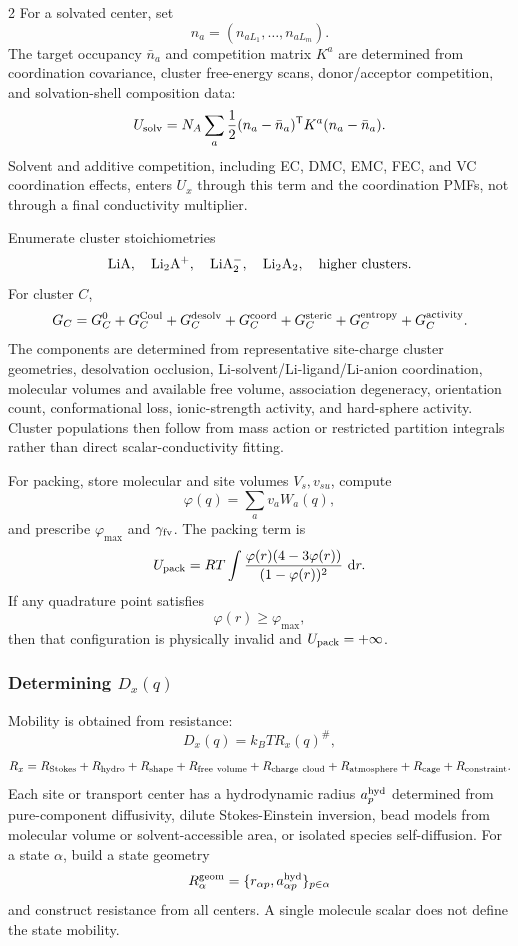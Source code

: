 \documentclass[10pt]{article}
\newcommand{\dd}{\,\mathrm d}
\newcommand{\T}{\mathsf{T}}
\begin{document}
\begin{multicols}{2}
For a solvated center, set
\[
n_a=(n_{aL_1},\ldots,n_{aL_m}).
\]
The target occupancy \(\bar n_a\) and competition matrix \(K^a\) are determined
from coordination covariance, cluster free-energy scans, donor/acceptor
competition, and solvation-shell composition data:
\[
U_{\rm solv}
=
N_A\sum_a\frac12(n_a-\bar n_a)^\T K^a(n_a-\bar n_a).
\]
Solvent and additive competition, including EC, DMC, EMC, FEC, and VC
coordination effects, enters \(U_x\) through this term and the coordination
PMFs, not through a final conductivity multiplier.

Enumerate cluster stoichiometries
\[
{\rm LiA},\quad {\rm Li_2A^+},\quad {\rm LiA_2^-},\quad
{\rm Li_2A_2},\quad {\rm higher\ clusters}.
\]
For cluster \(C\),
\[
G_C=
G_C^0
+G_C^{\rm Coul}
+G_C^{\rm desolv}
+G_C^{\rm coord}
+G_C^{\rm steric}
+G_C^{\rm entropy}
+G_C^{\rm activity}.
\]
The components are determined from representative site-charge cluster
geometries, desolvation occlusion, Li-solvent/Li-ligand/Li-anion coordination,
molecular volumes and available free volume, association degeneracy,
orientation count, conformational loss, ionic-strength activity, and
hard-sphere activity. Cluster populations then follow from mass action or
restricted partition integrals rather than direct scalar-conductivity fitting.

For packing, store molecular and site volumes \(V_s,v_{su}\), compute
\[
\varphi(q)=\sum_av_aW_a(q),
\]
and prescribe \(\varphi_{\max}\) and \(\gamma_{\rm fv}\). The packing term is
\[
U_{\rm pack}
=
RT\int
\frac{\varphi(r)(4-3\varphi(r))}
{(1-\varphi(r))^2}\,\dd r.
\]
If any quadrature point satisfies
\[
\varphi(r)\ge\varphi_{\max},
\]
then that configuration is physically invalid and \(U_{\rm pack}=+\infty\).

\subsubsection{Determining \(D_x(q)\)}

Mobility is obtained from resistance:
\[
D_x(q)=k_BT R_x(q)^\#,
\]
\[
R_x=
R_{\rm Stokes}
+R_{\rm hydro}
+R_{\rm shape}
+R_{\rm free\ volume}
+R_{\rm charge\ cloud}
+R_{\rm atmosphere}
+R_{\rm cage}
+R_{\rm constraint}.
\]
Each site or transport center has a hydrodynamic radius \(a_p^{\rm hyd}\)
determined from pure-component diffusivity, dilute Stokes-Einstein inversion,
bead models from molecular volume or solvent-accessible area, or isolated
species self-diffusion. For a state \(\alpha\), build a state geometry
\[
R_\alpha^{\rm geom}
=
\{r_{\alpha p},a_{\alpha p}^{\rm hyd}\}_{p\in\alpha}
\]
and construct resistance from all centers. A single molecule scalar does not
define the state mobility.


\end{multicols}
\end{document}
